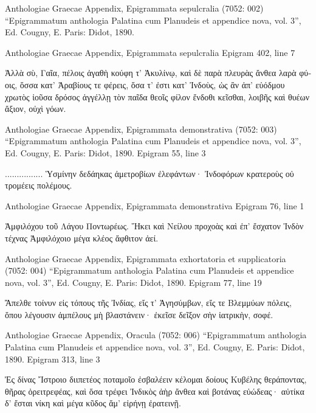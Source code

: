 \documentclass[12pt,letterpaper,twoside,final]{memoir}
\begin{document}
\begin{greek}

Anthologiae Graecae Appendix, Epigrammata sepulcralia (7052: 002)
“Epigrammatum anthologia Palatina cum Planudeis et appendice nova, vol. 3”, Ed. Cougny, E.
Paris: Didot, 1890.

Anthologiae Graecae Appendix, Epigrammata sepulcralia 
Epigram 402, line 7

Ἀλλὰ σὺ, Γαῖα, πέλοις ἀγαθὴ κούφη τ' Ἀκυλίνῳ, 
 καὶ δὲ παρὰ πλευρὰς ἄνθεα λαρὰ φύοις, 
ὅσσα κατ' Ἀραβίους τε φέρεις, ὅσα τ' ἐστι κατ' Ἰνδοὺς, 
 ὡς ἂν ἀπ' εὐόδμου χρωτὸς ἰοῦσα δρόσος 
ἀγγέλλῃ τὸν παῖδα θεοῖς φίλον ἔνδοθι κεῖσθαι, 
 λοιβῆς καὶ θυέων ἄξιον, οὐχὶ γόων. 

Anthologiae Graecae Appendix, Epigrammata demonstrativa (7052: 003)
“Epigrammatum anthologia Palatina cum Planudeis et appendice nova, vol. 3”, Ed. Cougny, E.
Paris: Didot, 1890.
Epigram 55, line 3

  ................ 
Ὑσμίνην δεδάηκας ἀμετροβίων ἐλεφάντων· 
 Ἰνδοφόρων κρατεροὺς οὐ τρομέεις πολέμους. 



Anthologiae Graecae Appendix, Epigrammata demonstrativa 
Epigram 76, line 1

Ἀμφιλόχου τοῦ Λάγου Ποντωρέως. 
Ἥκει καὶ Νείλου προχοὰς καὶ ἐπ' ἔσχατον Ἰνδὸν 
τέχνας Ἀμφιλόχοιο μέγα κλέος ἄφθιτον ἀεί. 


Anthologiae Graecae Appendix, Epigrammata exhortatoria et supplicatoria (7052: 004)
“Epigrammatum anthologia Palatina cum Planudeis et appendice nova, vol. 3”, Ed. Cougny, E.
Paris: Didot, 1890.
Epigram 77, line 19

Ἄπελθε τοίνυν εἰς τόπους τῆς Ἰνδίας, 
εἴς τ' Ἀγησύμβων, εἴς τε Βλεμμύων πόλεις, 
ὅπου λέγουσιν ἀμπέλους μὴ βλαστάνειν· 
ἐκεῖσε δεῖξον σὴν ἰατρικὴν, σοφέ. 



Anthologiae Graecae Appendix, Oracula (7052: 006)
“Epigrammatum anthologia Palatina cum Planudeis et appendice nova, vol. 3”, Ed. Cougny, E.
Paris: Didot, 1890.
Epigram 313, line 3

Ἐς δίνας Ἴστροιο διιπετέος ποταμοῖο 
ἐσβαλέειν κέλομαι δοίους Κυβέλης θεράποντας, 
θῆρας ὀρειτρεφέας, καὶ ὅσα τρέφει Ἰνδικὸς ἀὴρ 
ἄνθεα καὶ βοτάνας εὐώδεας· αὐτίκα δ' ἔσται 
νίκη καὶ μέγα κῦδος ἅμ' εἰρήνῃ ἐρατεινῇ. 


\end{greek}
\end{document}
